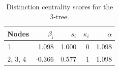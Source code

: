 \begin{table}
\centering
\caption{\label{tab:tree3}Distinction centrality scores for the 3-tree.}
\centering
\begin{tabular}[t]{lrrrr}
\toprule
Nodes & $\beta_i$ & $s_i$ & $\kappa_i$ & $\alpha$\\
\midrule
1 & 1.098 & 1.000 & 0 & 1.098\\
2, 3, 4 & -0.366 & 0.577 & 1 & 1.098\\
\bottomrule
\end{tabular}
\end{table}
